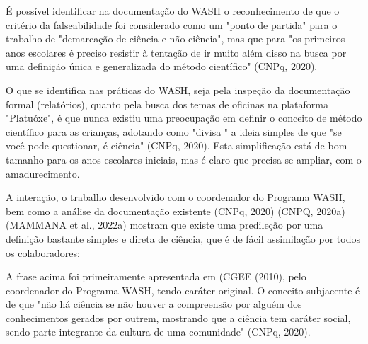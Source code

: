 \noindent\begin{center}\mbox{\centering{}}\end{center}


É possível identificar na documentação do WASH o reconhecimento de que o critério da falseabilidade foi considerado como um "ponto de partida" para o trabalho de "demarcação de ciência e não-ciência", mas que para "os primeiros anos escolares é preciso resistir à tentação de ir muito além disso na busca por uma definição única e generalizada do método científico" (CNPq, 2020).

O que se identifica nas práticas do WASH, seja pela inspeção da documentação formal (relatórios), quanto pela busca dos temas de oficinas na plataforma "Platuóxe", é que nunca existiu uma preocupação em definir o conceito de método científico para as crianças, adotando como "divisa " a ideia simples de que "se você pode questionar, é ciência" (CNPq, 2020). Esta simplificação está de bom tamanho para os anos escolares iniciais, mas é claro que precisa se ampliar, com o amadurecimento.

A interação, o trabalho desenvolvido com o coordenador do Programa WASH, bem como a análise da documentação existente (CNPq, 2020)  (CNPQ, 2020a)  (MAMMANA et al., 2022a) mostram que existe uma predileção por uma definição bastante simples e direta de ciência, que é de fácil assimilação por todos os colaboradores:


\noindent\begin{center}\mbox{\centering{}}\end{center}


A frase acima foi primeiramente apresentada em (CGEE (2010), pelo coordenador do Programa WASH, tendo caráter original. O conceito subjacente é de que "não há ciência se não houver a compreensão por alguém dos conhecimentos gerados por outrem, mostrando que a ciência tem caráter social, sendo parte integrante da cultura de uma comunidade" (CNPq, 2020).

